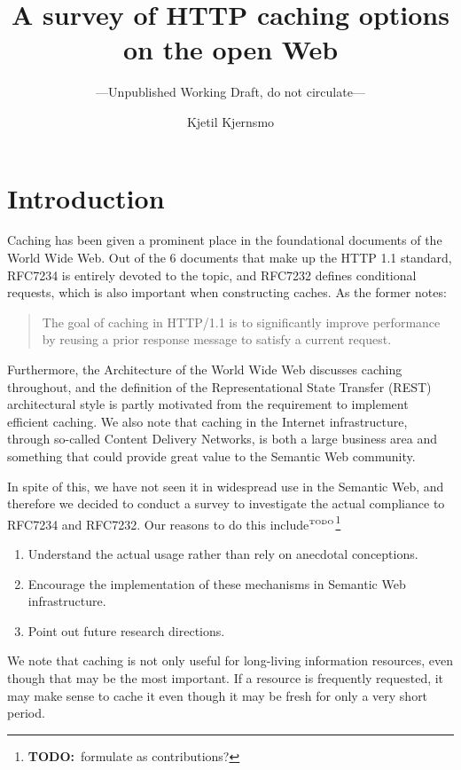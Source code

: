 \documentclass{llncs}
\title{A survey of HTTP caching options on the open Web}
\author{Kjetil Kjernsmo\inst{1}}
\institute{Department of Informatics,
Postboks 1080 Blindern,
N-0316 Oslo, Norway \email{kjetil@kjernsmo.net}}
\subtitle{---Unpublished Working Draft, do not circulate---}
\newcommand{\todo}[1]{\ensuremath{^{\textrm{\tiny{TODO}\normalsize}}}\footnote{\textbf{TODO:}~#1}}
\begin{document}
\maketitle

\begin{abstract}
\end{abstract}

\section{Introduction}

Caching has been given a prominent place in the foundational documents
of the World Wide Web. Out of the 6 documents that make up the HTTP
1.1 standard, RFC7234 \cite{rfc7234} is entirely devoted to the topic,
and RFC7232 \cite{rfc7232} defines conditional requests, which is also
important when constructing caches. As the former notes:
\begin{quote} 
  The goal of caching in HTTP/1.1 is to significantly improve
  performance by reusing a prior response message to satisfy a current
  request.
\end{quote}
Furthermore, the Architecture of the World Wide Web
\cite{Jacobs:04:AWW} discusses caching throughout, and the definition
of the Representational State Transfer (REST) architectural style
\cite{Fielding_2000_Architectural-Styles} is partly motivated from the
requirement to implement efficient caching. We also note that caching
in the Internet infrastructure, through so-called Content Delivery
Networks, is both a large business area and something that could
provide great value to the Semantic Web community.

In spite of this, we have not seen it in widespread use in the
Semantic Web, and therefore we decided to conduct a survey to
investigate the actual compliance to RFC7234 and RFC7232. Our reasons
to do this include\todo{formulate as contributions?}
\begin{enumerate}
\item Understand the actual usage rather than rely on anecdotal
  conceptions.
\item Encourage the implementation of these mechanisms in Semantic Web
  infrastructure.
\item Point out future research directions.
\end{enumerate}

We note that caching is not only useful for long-living information
resources, even though that may be the most important. If a resource
is frequently requested, it may make sense to cache it even though it
may be fresh for only a very short period.
\end{document}
